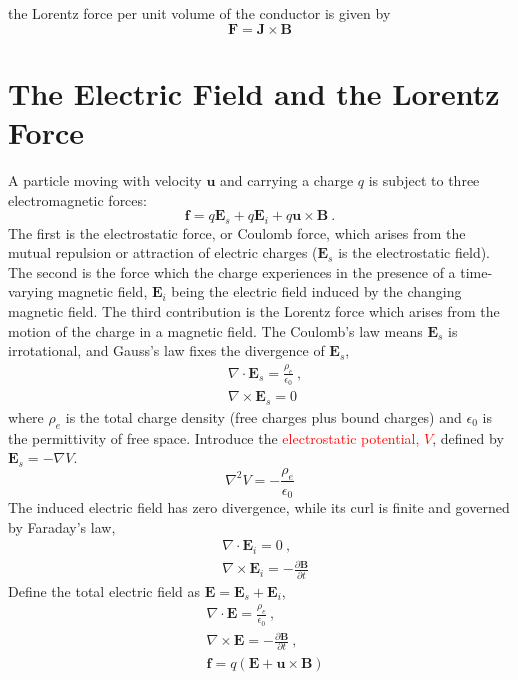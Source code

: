 \documentclass[12pt,a4paper]{article}
\renewcommand{\vec}[1]{\boldsymbol{#1}}
\begin{document}
the Lorentz force per unit volume of the conductor is given by
\begin{equation}
\vec{F} = \vec{J} \times \vec{B}
\end{equation}


\section{The Electric Field and the Lorentz Force}
A particle moving with velocity $\vec{u}$ and carrying a charge $q$ is subject to three electromagnetic forces:
\begin{equation}
\vec{f} = q\vec{E}_s +q\vec{E}_i +q\vec{u}\times \vec{B} ~.
\end{equation}
The first is the electrostatic force, or Coulomb force, which arises from the mutual repulsion or attraction of electric charges ($\vec{E}_s$ is the electrostatic field). The second is the force which the charge experiences in the presence of a time-varying magnetic field, $\vec{E}_i$ being the electric field induced by the changing magnetic field. The third contribution is the Lorentz force which arises from the motion of the charge in a magnetic field. The Coulomb's law means $\vec{E}_s$ is irrotational, and Gauss's law fixes the divergence of $\vec{E}_s$,
\begin{align}
& \nabla \cdot \vec{E}_s = \frac{\rho_e}{\epsilon_0} ~, \\
& \nabla \times \vec{E}_s = 0
\end{align}
where $\rho_e$ is the total charge density (free charges plus bound charges) and $\epsilon_0$ is the permittivity of free space. Introduce the \textcolor{red}{electrostatic potential, $V$}, defined by $\vec{E}_s = -\nabla V$.
\begin{equation*}
\nabla^2 V = -\frac{\rho_e}{\epsilon_0}
\end{equation*}
The induced electric field has zero divergence, while its curl is finite and governed by Faraday's law,
\begin{align}
& \nabla \cdot \vec{E}_i = 0 ~, \\
& \nabla \times \vec{E}_i = -\frac{\partial \vec{B}}{\partial t}
\end{align}
Define the total electric field as $\vec{E} =  \vec{E}_s +  \vec{E}_i$,
\begin{align}
& \nabla \cdot \vec{E} = \frac{\rho_e}{\epsilon_0} ~, \\
& \nabla \times \vec{E} = -\frac{\partial \vec{B}}{\partial t} ~, \\
& \vec{f} = q(\vec{E} +\vec{u}\times \vec{B} )
\end{align}
\end{document}

